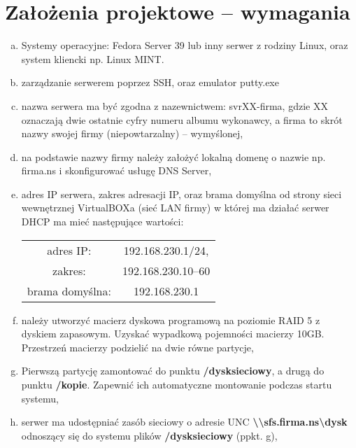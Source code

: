 \documentclass[a4paper]{article}
\begin{document}
\section{Założenia projektowe – wymagania}
\begin{enumerate}[a)] %
      \item Systemy operacyjne: Fedora Server 39 lub inny serwer z rodziny Linux, oraz system kliencki 
      np. Linux MINT. 
      \item zarządzanie serwerem poprzez SSH, oraz emulator putty.exe 
      \item nazwa serwera ma być zgodna z nazewnictwem: svrXX-firma, gdzie XX oznaczają dwie 
      ostatnie cyfry numeru albumu wykonawcy, a firma to skrót nazwy swojej 
      firmy (niepowtarzalny) – wymyślonej, 
      \item na podstawie nazwy firmy należy założyć lokalną domenę o nazwie np. firma.ns i 
      skonfigurować usługę DNS Server, 
      \item adres IP serwera, zakres adresacji IP, oraz brama domyślna od strony sieci wewnętrznej 
      VirtualBOXa (sieć LAN firmy) w której ma działać serwer DHCP ma mieć następujące 
      wartości:
      \vspace{-2mm}
            \begin{center}
                  \begin{tabular}{cc}
                        adres IP:& 192.168.230.1/24,\\
                        zakres:& 192.168.230.10–60\\
                        brama domyślna:  & 192.168.230.1\\
                  \end{tabular}
            \end{center}
      \vspace{-2mm}
      \item należy utworzyć macierz dyskowa programową na poziomie RAID 5 z dyskiem zapasowym. 
      Uzyskać wypadkową pojemności macierzy 10GB. Przestrzeń macierzy podzielić na dwie 
      równe partycje, 
      \item Pierwszą partycję zamontować do punktu \textbf{/dysksieciowy}, a drugą do punktu \textbf{/kopie}. 
      Zapewnić ich automatyczne montowanie podczas startu systemu, 
      \item  serwer ma udostępniać zasób sieciowy o adresie UNC \textbf{\textbackslash \textbackslash sfs.firma.ns\textbackslash dysk} odnoszący się do systemu plików \textbf{/dysksieciowy} (ppkt. g), 

\end{enumerate}
\end{document}
